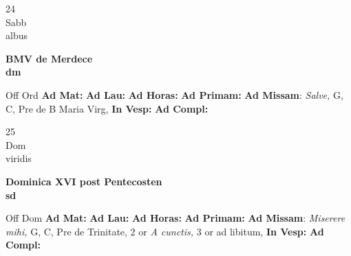 \documentclass[10pt, openany]{book}
\begin{document}
        \begin{center}
            \begin{minipage}{3.5in}
                \vspace{2em}
                \begin{minipage}{0.5in}
                    {\Huge 24} \\
                    {\normalsize Sabb} \\
                    {\normalsize albus}
                \end{minipage}
                \begin{minipage}{3.0in}
                    \textbf{ \large BMV de Merdece \\
                    \textnormal{\normalsize dm}} \\ 
                \end{minipage}
                \begin{justify}Off Ord
                    \textbf{Ad Mat: }
                    \textbf{Ad Lau: }
                    \textbf{Ad Horas: }
                    \textbf{Ad Primam: }\textbf{Ad Missam}: \textit{Salve,} G, C, Pre de B Maria Virg,  
                    \textbf{In Vesp: }
                    \textbf{Ad Compl: }
                \end{justify}
            \end{minipage}
        \end{center}
    
        \begin{center}
            \begin{minipage}{3.5in}
                \vspace{2em}
                \begin{minipage}{0.5in}
                    {\Huge 25} \\
                    {\normalsize Dom} \\
                    {\normalsize viridis}
                \end{minipage}
                \begin{minipage}{3.0in}
                    \textbf{ \large Dominica XVI post Pentecosten \\
                    \textnormal{\normalsize sd}} \\ 
                \end{minipage}
                \begin{justify}Off Dom
                    \textbf{Ad Mat: }
                    \textbf{Ad Lau: }
                    \textbf{Ad Horas: }
                    \textbf{Ad Primam: }\textbf{Ad Missam}: \textit{Miserere mihi,} G, C, Pre de Trinitate, 2 or \textit{A cunctis,} 3 or ad libitum,  
                    \textbf{In Vesp: }
                    \textbf{Ad Compl: }
                \end{justify}
            \end{minipage}
        \end{center}
    
\end{document}
